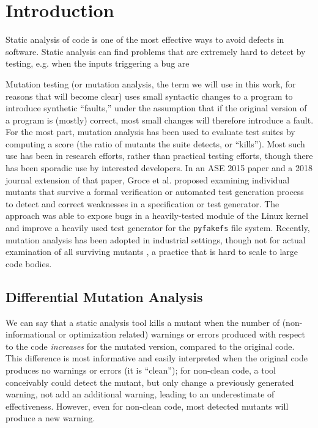 \section{Introduction}

Static analysis of code is one of the most effective ways to avoid defects in software.  Static analysis can find problems that are extremely hard to detect by testing, e.g. when the inputs triggering a bug are 

Mutation testing \cite{demillo1978hints,budd1980theoretical} (or mutation analysis, the term we will use in this work, for reasons that will become clear) uses small syntactic changes to a program to introduce synthetic ``faults,'' under the assumption that if the original version of a program is (mostly) correct, most small changes will therefore introduce a fault.  For the most part, mutation analysis has been used to evaluate test suites by computing a score (the ratio of mutants the suite detects, or ``kills'').  Most such use has been in research efforts, rather than practical testing efforts, though there has been sporadic use by interested developers.
In an ASE 2015 \cite{groce2015verified} paper and a 2018 journal extension \cite{groce2018verified} of that paper, Groce et al. proposed examining individual mutants that survive a formal verification or automated test generation process to detect and correct weaknesses in a specification or test generator.  The approach was able to expose bugs in a heavily-tested module of the Linux kernel \cite{mutKernel} and improve a heavily used test generator for the {\tt pyfakefs} file system.  Recently, mutation analysis has been adopted in industrial settings, though not for actual examination of all surviving mutants \cite{MutGoogle,ivankovic2018industrial}, a practice that is hard to scale to large code bodies.

\subsection{Differential Mutation Analysis}

We can say that a static analysis tool kills a mutant when the number of (non-informational or optimization related) warnings or errors produced with respect to the code \emph{increases} for the mutated version, compared to the original code.  This difference is most informative and easily interpreted when the original code produces no warnings or errors (it is ``clean''); for non-clean code, a tool conceivably could detect the mutant, but only change a previously generated warning, not add an additional warning, leading to an underestimate of effectiveness.  However, even for non-clean code, most detected mutants will produce a new warning.

